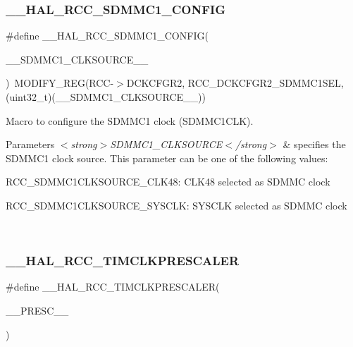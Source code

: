 \subsubsection{\texorpdfstring{\_\_HAL\_RCC\_SDMMC1\_CONFIG}{\_\_HAL\_RCC\_SDMMC1\_CONFIG}}
{\footnotesize\ttfamily \#define \+\_\+\+\_\+\+H\+A\+L\+\_\+\+R\+C\+C\+\_\+\+S\+D\+M\+M\+C1\+\_\+\+C\+O\+N\+F\+IG(\begin{DoxyParamCaption}\item[{}]{\+\_\+\+\_\+\+S\+D\+M\+M\+C1\+\_\+\+C\+L\+K\+S\+O\+U\+R\+C\+E\+\_\+\+\_\+ }\end{DoxyParamCaption})~M\+O\+D\+I\+F\+Y\+\_\+\+R\+EG(R\+CC-\/$>$D\+C\+K\+C\+F\+G\+R2, R\+C\+C\+\_\+\+D\+C\+K\+C\+F\+G\+R2\+\_\+\+S\+D\+M\+M\+C1\+S\+EL, (uint32\+\_\+t)(\+\_\+\+\_\+\+S\+D\+M\+M\+C1\+\_\+\+C\+L\+K\+S\+O\+U\+R\+C\+E\+\_\+\+\_\+))}



Macro to configure the S\+D\+M\+M\+C1 clock (S\+D\+M\+M\+C1\+C\+LK). 


\begin{DoxyParams}{Parameters}
{\em $<$strong$>$\+S\+D\+M\+M\+C1\+\_\+\+C\+L\+K\+S\+O\+U\+R\+C\+E$<$/strong$>$} & specifies the S\+D\+M\+M\+C1 clock source. This parameter can be one of the following values\+: \begin{DoxyItemize}
\item R\+C\+C\+\_\+\+S\+D\+M\+M\+C1\+C\+L\+K\+S\+O\+U\+R\+C\+E\+\_\+\+C\+L\+K48\+: C\+L\+K48 selected as S\+D\+M\+MC clock \item R\+C\+C\+\_\+\+S\+D\+M\+M\+C1\+C\+L\+K\+S\+O\+U\+R\+C\+E\+\_\+\+S\+Y\+S\+C\+LK\+: S\+Y\+S\+C\+LK selected as S\+D\+M\+MC clock \end{DoxyItemize}
\\
\hline
\end{DoxyParams}
\mbox{\label{group___r_c_c_ex___exported___macros_ga292ca7c84f192778314125ed6d7c8333}} 
\subsubsection{\texorpdfstring{\_\_HAL\_RCC\_TIMCLKPRESCALER}{\_\_HAL\_RCC\_TIMCLKPRESCALER}}
{\footnotesize\ttfamily \#define \+\_\+\+\_\+\+H\+A\+L\+\_\+\+R\+C\+C\+\_\+\+T\+I\+M\+C\+L\+K\+P\+R\+E\+S\+C\+A\+L\+ER(\begin{DoxyParamCaption}\item[{}]{\+\_\+\+\_\+\+P\+R\+E\+S\+C\+\_\+\+\_\+ }\end{DoxyParamCaption})}

